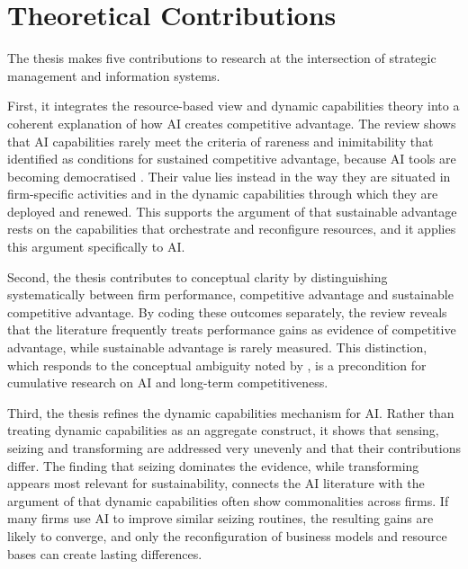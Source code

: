 \section{Theoretical Contributions}
\label{sec:contributions}

The thesis makes five contributions to research at the intersection of strategic management and information systems.

First, it integrates the resource-based view and dynamic capabilities theory into a coherent explanation of how AI creates competitive advantage. The review shows that AI capabilities rarely meet the criteria of rareness and inimitability that \textcite[99]{barney1991} identified as conditions for sustained competitive advantage, because AI tools are becoming democratised \parencite[583]{cui2024}. Their value lies instead in the way they are situated in firm-specific activities \parencite[618]{slrR087} and in the dynamic capabilities through which they are deployed and renewed. This supports the argument of \textcite[1319]{teece2007} that sustainable advantage rests on the capabilities that orchestrate and reconfigure resources, and it applies this argument specifically to AI.

Second, the thesis contributes to conceptual clarity by distinguishing systematically between firm performance, competitive advantage and sustainable competitive advantage. By coding these outcomes separately, the review reveals that the literature frequently treats performance gains as evidence of competitive advantage, while sustainable advantage is rarely measured. This distinction, which responds to the conceptual ambiguity noted by \textcite[1]{wu2026}, is a precondition for cumulative research on AI and long-term competitiveness.

Third, the thesis refines the dynamic capabilities mechanism for AI. Rather than treating dynamic capabilities as an aggregate construct, it shows that sensing, seizing and transforming are addressed very unevenly and that their contributions differ. The finding that seizing dominates the evidence, while transforming appears most relevant for sustainability, connects the AI literature with the argument of \textcite[1105]{eisenhardt2000} that dynamic capabilities often show commonalities across firms. If many firms use AI to improve similar seizing routines, the resulting gains are likely to converge, and only the reconfiguration of business models and resource bases can create lasting differences.

